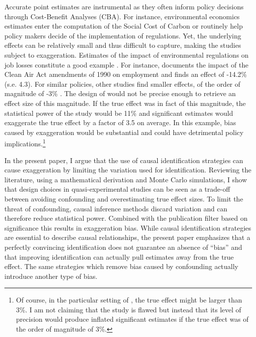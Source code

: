 			 Accurate point estimates are instrumental as they often inform policy decisions through Cost-Benefit Analyses (CBA). For instance, environmental economics estimates enter the computation of the Social Cost of Carbon or routinely help policy makers decide of the implementation of regulations. Yet, the underlying effects can be relatively small and thus difficult to capture, making the studies subject to exaggeration. Estimates of the impact of environmental regulations on job losses constitute a good example \citep{gray_environmental_2023}. For instance, \cite{walker_environmental_2011} documents the impact of the Clean Air Act amendments of 1990 on employment and finds an effect of -14.2\% (s.e. 4.3). For similar policies, other studies find smaller effects, of the order of magnitude of -3\% \citep{greenstone_impacts_2002, gray_environmental_2023}. The design of \cite{walker_environmental_2011} would not be precise enough to retrieve an effect size of this magnitude. If the true effect was in fact of this magnitude, the statistical power of the study would be 11\% and significant estimates would exaggerate the true effect by a factor of 3.5 on average. In this example, bias caused by exaggeration would be substantial and could have detrimental policy implications.\footnote{Of course, in the particular setting of \cite{walker_environmental_2011}, the true effect might be larger than 3\%. I am not claiming that the study is flawed but instead that its level of precision would produce inflated significant estimates if the true effect was of the order of magnitude of 3\%.}
			
			In the present paper, I argue that the use of causal identification strategies can cause exaggeration by limiting the variation used for identification. %
			Reviewing the literature, using a mathematical derivation and Monte Carlo simulations, I show that design choices in quasi-experimental studies can be seen as a trade-off between avoiding confounding and overestimating true effect sizes. To limit the threat of confounding, causal inference methods discard variation and can therefore reduce statistical power. Combined with the publication filter based on significance this results in exaggeration bias. While causal identification strategies are essential to describe causal relationships, the present paper emphasizes that a perfectly convincing identification does not guarantee an absence of ``bias'' and that improving identification can actually pull estimates away from the true effect. The same strategies which remove bias caused by confounding actually introduce another type of bias. 
			
